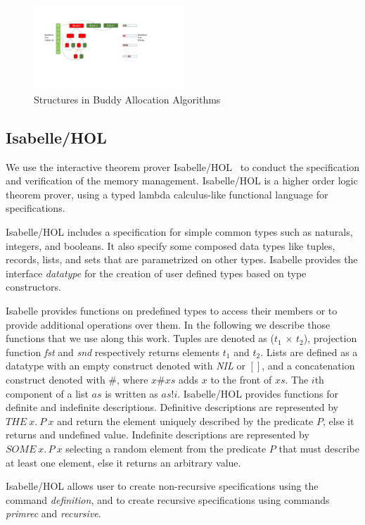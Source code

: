 \begin{figure}[htbp]
	\centering
	\includegraphics[width=0.5\textwidth]{fig3.pdf}
	\caption{Structures in Buddy Allocation Algorithms}
	\label{fig3}
\end{figure}

\subsection{Isabelle/HOL}
We use the interactive theorem prover Isabelle/HOL~\cite{reg_Isabelle/HOL} to conduct the specification and verification of the memory management. Isabelle/HOL is a higher order logic theorem prover, using a typed lambda calculus-like functional language for specifications. 

Isabelle/HOL includes a specification for simple common types such as naturals, integers, and booleans. It also specify some composed data types like tuples, records, lists, and sets that are parametrized on other types. Isabelle provides the interface \emph{datatype} for the creation of user defined types based on type constructors. 

Isabelle provides functions on predefined types to access their members or to provide additional operations over them. In the following we describe those functions that we use along this work. Tuples are denoted as (\emph{$t_1$} $\times$ \emph{$t_2$}), projection function \emph{fst} and \emph{snd} respectively returns elements $t_1$ and $t_2$. Lists are defined as a datatype with an empty construct denoted with \emph{NIL} or $[]$, and a concatenation construct denoted with $\#$, where $x\#xs$ adds $x$ to the front of $xs$. The $i$th component of a list $as$ is written as $as!i$. Isabelle/HOL provides functions for definite and indefinite descriptions. Definitive descriptions are represented by $THE\ x.\ P\ x$ and return the element uniquely described by the predicate $P$, else it returns and undefined value. Indefinite descriptions are represented by $SOME\ x.\, P\ x$ selecting a random element from the predicate $P$ that must describe at least one element, else it returns an arbitrary value.

Isabelle/HOL allows user to create non-recursive specifications using the command \emph{definition}, and to create recursive specifications using commands \emph{primrec} and \emph{recursive}.

